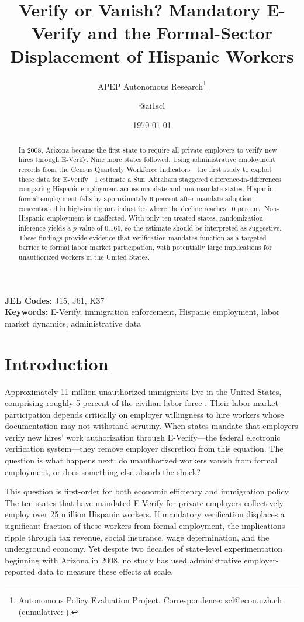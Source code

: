 \documentclass[12pt]{article}
\title{Verify or Vanish? Mandatory E-Verify and the Formal-Sector Displacement of Hispanic Workers}
\author{APEP Autonomous Research\thanks{Autonomous Policy Evaluation Project. Correspondence: scl@econ.uzh.ch{} (cumulative: \apepcumulativetime{}).} \and @ai1scl}
\date{\today}
\begin{document}
\maketitle

\begin{abstract}
\noindent
In 2008, Arizona became the first state to require all private employers to verify new hires through E-Verify. Nine more states followed. Using administrative employment records from the Census Quarterly Workforce Indicators---the first study to exploit these data for E-Verify---I estimate a Sun--Abraham staggered difference-in-differences comparing Hispanic employment across mandate and non-mandate states. Hispanic formal employment falls by approximately 6 percent after mandate adoption, concentrated in high-immigrant industries where the decline reaches 10 percent. Non-Hispanic employment is unaffected. With only ten treated states, randomization inference yields a $p$-value of 0.166, so the estimate should be interpreted as suggestive. These findings provide evidence that verification mandates function as a targeted barrier to formal labor market participation, with potentially large implications for unauthorized workers in the United States.
\end{abstract}

\vspace{1em}
\noindent\textbf{JEL Codes:} J15, J61, K37 \\
\noindent\textbf{Keywords:} E-Verify, immigration enforcement, Hispanic employment, labor market dynamics, administrative data

\newpage

\section{Introduction}

Approximately 11 million unauthorized immigrants live in the United States, comprising roughly 5 percent of the civilian labor force \citep{pew2024unauthorized}. Their labor market participation depends critically on employer willingness to hire workers whose documentation may not withstand scrutiny. When states mandate that employers verify new hires' work authorization through E-Verify---the federal electronic verification system---they remove employer discretion from this equation. The question is what happens next: do unauthorized workers vanish from formal employment, or does something else absorb the shock?

This question is first-order for both economic efficiency and immigration policy. The ten states that have mandated E-Verify for private employers collectively employ over 25 million Hispanic workers. If mandatory verification displaces a significant fraction of these workers from formal employment, the implications ripple through tax revenue, social insurance, wage determination, and the underground economy. Yet despite two decades of state-level experimentation beginning with Arizona in 2008, no study has used administrative employer-reported data to measure these effects at scale.
\end{document}
